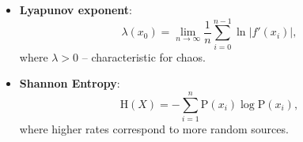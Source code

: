 \begin{itemize}
    \item \textbf{Lyapunov exponent}:
\begin{equation*}
    \lambda (x_{0})=\lim _{n\to \infty }{\frac {1}{n}}\sum _{i=0}^{n-1}\ln |f'(x_{i})|,
\end{equation*}
where $\lambda >0$ -- characteristic for chaos.
    \vspace{10mm}

    \item \textbf{Shannon  Entropy}:
\begin{equation*}
    \mathrm {H} (X)=-\sum _{i=1}^{n}{\mathrm {P} (x_{i})\log \mathrm {P} (x_{i})},
\end{equation*}
where higher rates correspond to more random sources.
\end{itemize}